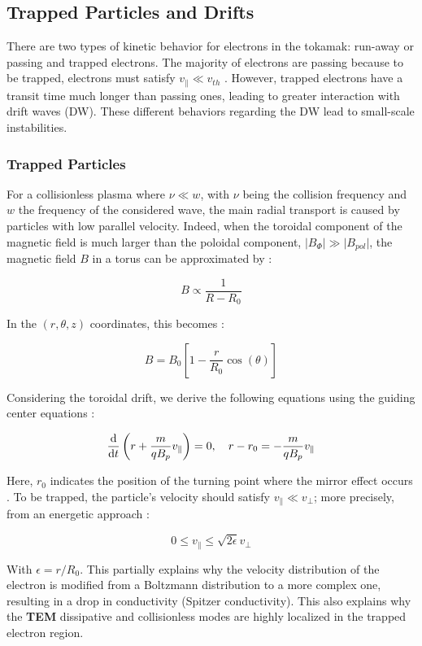 \documentclass[11pt,openany]{report}
\begin{document}
\begin{multicols}{2}
    \subsection{Trapped Particles and Drifts}

    There are two types of kinetic behavior for electrons in the tokamak: run-away or passing and trapped electrons. The majority of electrons are passing because to be trapped, electrons must satisfy $v_\parallel \ll v_{th}$ \cite{book_banana}\cite{Banana_distr_runaway}. However, trapped electrons have a transit time much longer than passing ones, leading to greater interaction with drift waves (DW). These different behaviors regarding the DW lead to small-scale instabilities.

    \subsubsection{Trapped Particles}

    For a collisionless plasma where $\nu \ll w$, with $\nu$ being the collision frequency and $w$ the frequency of the considered wave, the main radial transport is caused by particles with low parallel velocity. Indeed, when the toroidal component of the magnetic field is much larger than the poloidal component, $\vert B_\Phi \vert \gg \vert B_{pol} \vert$, the magnetic field $B$ in a torus can be approximated by :

    $$
        B \propto \frac{1}{R - R_0}
    $$

    In the $(r, \theta, z)$ coordinates, this becomes :

    $$
        B = B_0\left[1 - \frac{r}{R_0}\cos(\theta)\right]
    $$

    Considering the toroidal drift, we derive the following equations using the guiding center equations \cite{book_banana} :

    $$
        \dv{t}\left(r + \frac{m}{qB_p}v_\parallel\right) = 0, \quad r - r_0 = -\frac{m}{qB_p}v_\parallel
    $$

    Here, $r_0$ indicates the position of the turning point where the mirror effect occurs \cite{TEM_mirror_localization}. To be trapped, the particle's velocity should satisfy $v_\parallel \ll v_\perp$; more precisely, from an energetic approach \cite{Banana_distr_runaway}:

    $$
        0 \leq v_\parallel \leq \sqrt{2\epsilon} v_\perp
    $$

    With $\epsilon = r/R_0$. This partially explains why the velocity distribution of the electron \cite{TEM_slow,Banana_distr_runaway} is modified from a Boltzmann distribution to a more complex one, resulting in a drop in conductivity (Spitzer conductivity). This also explains why the \textbf{TEM} dissipative and collisionless modes are highly localized in the trapped electron region.


\end{multicols}
\end{document}
